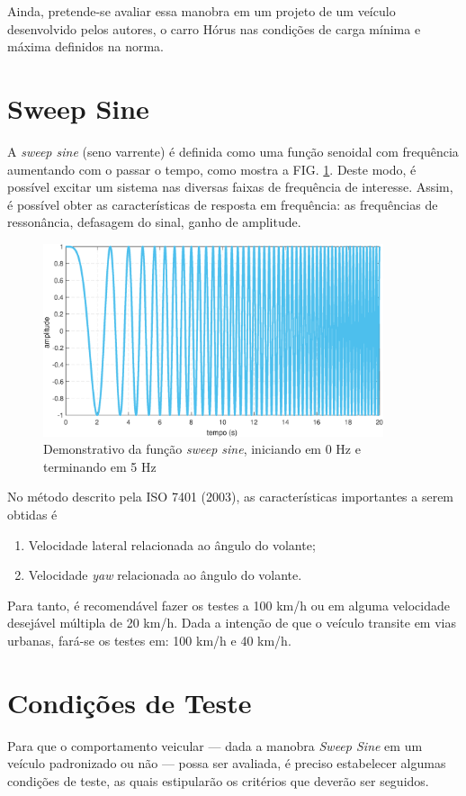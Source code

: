 \documentclass[a4paper, 12pt]{article}
\begin{document}
Ainda, pretende-se avaliar essa manobra em um projeto de um veículo desenvolvido pelos autores, o carro Hórus nas condições de carga mínima e máxima definidos na norma. 

\section{Sweep Sine}
A \textit{sweep sine} (seno varrente) é definida como uma função senoidal com frequência aumentando com o passar o tempo, como mostra a FIG.  \ref{graf:sweep_sine_exemplo}. Deste modo, é possível excitar um sistema nas diversas faixas de frequência de interesse. Assim, é possível obter as características de resposta em frequência: as frequências de ressonância, defasagem do sinal, ganho de amplitude.
\begin{figure}[h]
    \centering
    \includegraphics[width=10cm]{imagens/sweep_sine.eps}
    \caption{Demonstrativo da função \textit{sweep sine}, iniciando em 0 Hz e terminando em 5 Hz}
    \label{graf:sweep_sine_exemplo}
\end{figure}


No método descrito pela ISO 7401 (2003), as características importantes a serem obtidas é
\begin{enumerate}
    \item Velocidade lateral relacionada ao ângulo do volante;
    \item Velocidade \textit{yaw} relacionada ao ângulo do volante.
\end{enumerate}

Para tanto, é recomendável fazer os testes a 100 km/h ou em alguma velocidade desejável múltipla de 20 km/h. Dada a intenção de que o veículo transite em vias urbanas, fará-se os testes em: 100 km/h e 40 km/h.

\section{Condições de Teste}
Para que o comportamento veicular --- dada a manobra \textit{Sweep Sine} em um veículo padronizado ou não --- possa ser avaliada, é preciso estabelecer algumas condições de teste, as quais estipularão os critérios que deverão ser seguidos.
\end{document}
